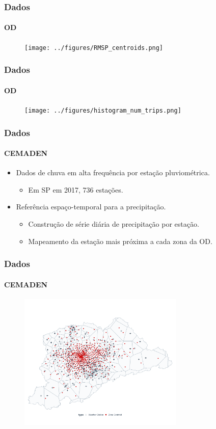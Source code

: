 \begin{frame}[plain]
    \frametitle{Dados}
    \framesubtitle{OD}
    \begin{figure}[H]
        \centering
        \texttt{[image: ../figures/RMSP\_centroids.png]}
        \label{fig:od_centroids}
    \end{figure} 
\end{frame}
\begin{frame}[plain]
    \frametitle{Dados}
    \framesubtitle{OD}
    \begin{figure}[H]
        \centering
        \texttt{[image: ../figures/histogram\_num\_trips.png]}
        \label{fig:hist_num_trips}
    \end{figure} 
\end{frame}

\begin{frame}
    \frametitle{Dados}
    \framesubtitle{CEMADEN}
    \begin{itemize}
    \item Dados de chuva em alta frequência por estação pluviométrica.
    \begin{itemize}
        \item Em SP em 2017, 736 estações.
    \end{itemize}
    \item Referência espaço-temporal para a precipitação.
    \begin{itemize}
        \item Construção de série diária de precipitação por estação.
        \item Mapeamento da estação mais próxima a cada zona da OD.
    \end{itemize}
    \end{itemize}
\end{frame}

\begin{frame}[plain]
    \frametitle{Dados}
    \framesubtitle{CEMADEN}
    \begin{figure}[H]
        \centering
        \includegraphics[width=0.7\textwidth]{../figures/RMSP_voronoi.png}
        \label{fig:cemaden_voronoi}
    \end{figure} 
\end{frame}

